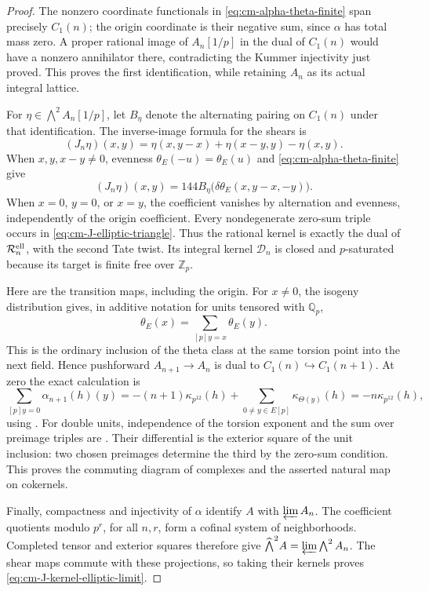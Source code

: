 \begin{proof}
The nonzero coordinate functionals in
\eqref{eq:cm-alpha-theta-finite} span precisely
\(C_1(n)\); the origin coordinate is their negative
sum, since \(\alpha\) has total mass zero.
A proper rational image of \(A_n[1/p]\) in the dual
of \(C_1(n)\) would have a nonzero annihilator there,
contradicting the Kummer injectivity just proved.
This proves the first identification, while retaining
\(A_n\) as its actual integral lattice.

For \(\eta\in\bigwedge^2A_n[1/p]\), let
\(B_\eta\) denote the alternating pairing on \(C_1(n)\)
under that identification.  The inverse-image formula
for the shears is
\[
 (J_n\eta)(x,y)=\eta(x,y-x)+\eta(x-y,y)-\eta(x,y).
\]
When \(x,y,x-y\ne0\), evenness
\(\theta_E(-u)=\theta_E(u)\) and
\eqref{eq:cm-alpha-theta-finite} give
\begin{equation}\label{eq:cm-J-elliptic-triangle}
 (J_n\eta)(x,y)
       =144 B_\eta\bigl(\delta\theta_E(x,y-x,-y)\bigr).
\end{equation}
When \(x=0\), \(y=0\), or \(x=y\), the coefficient
vanishes by alternation and evenness, independently
of the origin coefficient.  Every nondegenerate
zero-sum triple occurs in
\eqref{eq:cm-J-elliptic-triangle}.
Thus the rational kernel is exactly the dual of
\(\mathcal R_n^{\rm ell}\), with the second Tate
twist.  Its integral kernel \(\mathcal D_n\) is
closed and \(p\)-saturated because its target is
finite free over \(\mathbb Z_p\).

Here are the transition maps, including the origin.
For \(x\ne0\), the isogeny distribution gives, in
additive notation for units tensored with \(\mathbb Q_p\),
\[
 \theta_E(x)=\sum_{[p]y=x}\theta_E(y).
\]
This is the ordinary inclusion of the theta class at
the same torsion point into the next field.  Hence
pushforward \(A_{n+1}\to A_n\) is dual to
\(C_1(n)\hookrightarrow C_1(n+1)\).
At zero the exact calculation is
\[
 \sum_{[p]y=0}\alpha_{n+1}(h)(y)
   =-(n+1)\kappa_{p^{12}}(h)
         +\sum_{0\ne y\in E[p]}\kappa_{\Theta(y)}(h)
   =-n\kappa_{p^{12}}(h),
\]
using \cite[Proposition (2.2)(3), p.~204]{Nakamura1995}.
For double units, independence of the torsion exponent
and the sum over preimage triples are
\cite[Lemma 2.12, p.~17, and equation (41), p.~16]{GoncharovEuler}.
Their differential is the exterior square of the
unit inclusion: two chosen preimages determine the
third by the zero-sum condition.  This proves the
commuting diagram of complexes and the asserted
natural map on cokernels.

Finally, compactness and injectivity of \(\alpha\)
identify \(A\) with \(\varprojlim A_n\).
The coefficient quotients modulo \(p^r\), for all
\(n,r\), form a cofinal system of neighborhoods.
Completed tensor and exterior squares therefore give
\(\widehat{\bigwedge}^2A=\varprojlim\bigwedge^2A_n\).
The shear maps commute with these projections,
so taking their kernels proves
\eqref{eq:cm-J-kernel-elliptic-limit}.
\end{proof}

